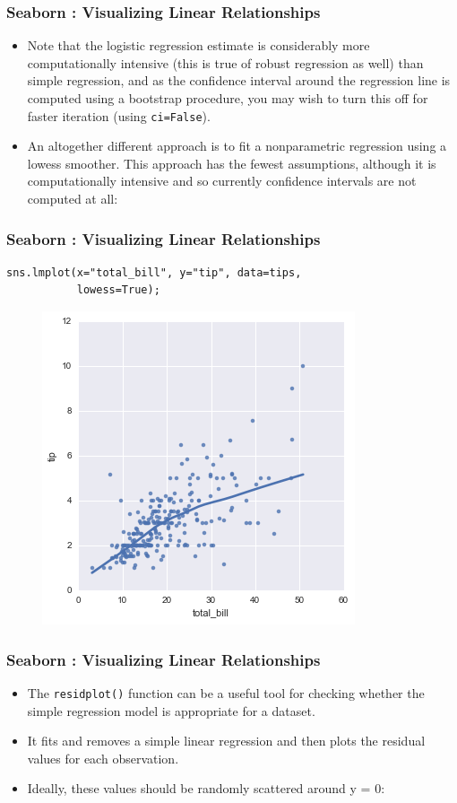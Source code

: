\documentclass{beamer}
\begin{document}
\begin{frame}
		\frametitle{Seaborn : Visualizing Linear Relationships}
\large
\begin{itemize}
\item Note that the logistic regression estimate is considerably more computationally intensive (this is true of robust regression as well) than simple regression, and as the confidence interval around the regression line is computed using a bootstrap procedure, you may wish to turn this off for faster iteration (using \texttt{ci=False}).
\item An altogether different approach is to fit a nonparametric regression using a lowess smoother. This approach has the fewest assumptions, although it is computationally intensive and so currently confidence intervals are not computed at all:
\end{itemize}


\end{frame}
\begin{frame}[fragile]
		\frametitle{Seaborn : Visualizing Linear Relationships}
	\large

\begin{verbatim}
sns.lmplot(x="total_bill", y="tip", data=tips,
           lowess=True);
           \end{verbatim}
\begin{figure}
	\centering
	\includegraphics[width=0.55\linewidth]{images/regression_33_0}
\end{figure}

\end{frame}
\begin{frame}[fragile]
		\frametitle{Seaborn : Visualizing Linear Relationships}
	\large
\begin{itemize}
\item The \texttt{residplot()} function can be a useful tool for checking whether the simple regression model is appropriate for a dataset. 
\item It fits and removes a simple linear regression and then plots the residual values for each observation. 
\item Ideally, these values should be randomly scattered around y = 0:
\end{itemize}	


\end{frame}
\end{document}
